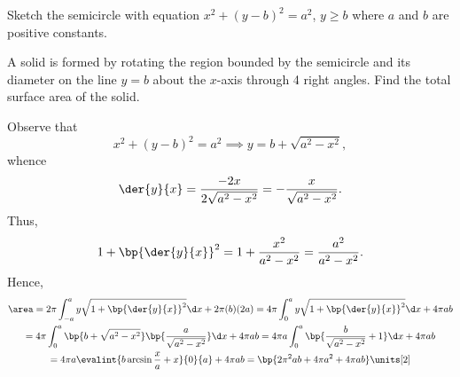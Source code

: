 \begin{problem}
    Sketch the semicircle with equation $x^2 + (y-b)^2 = a^2$, $y \geq b$ where $a$ and $b$ are positive constants.

    A solid is formed by rotating the region bounded by the semicircle and its diameter on the line $y = b$ about the $x$-axis through 4 right angles. Find the total surface area of the solid.
\end{problem}
\begin{solution}
    \begin{center}
    \end{center}

    Observe that \[x^2 + (y-b)^2 = a^2 \implies y = b + \sqrt{a^2- x^2},\] whence \[\der{y}{x} = \frac{-2x}{2\sqrt{a^2 - x^2}} = -\frac{x}{\sqrt{a^2 - x^2}}.\] Thus, \[1 + \bp{\der{y}{x}}^2 = 1 + \frac{x^2}{a^2 - x^2} = \frac{a^2}{a^2 - x^2}.\] Hence,
    \begin{gather*}
        \area = 2\pi \int_{-a}^{a} y \sqrt{1 + \bp{\der{y}{x}}^2} \d x + 2\pi(b)(2a) = 4\pi \int_0^{a} y \sqrt{1 + \bp{\der{y}{x}}^2} \d x + 4\pi ab\\
        = 4\pi \int_0^a \bp{b + \sqrt{a^2 - x^2}} \bp{\frac{a}{\sqrt{a^2 - x^2}}} \d x + 4\pi ab = 4\pi a \int_0^a \bp{\frac{b}{\sqrt{{a^2-x^2}}} + 1} \d x + 4\pi ab\\
        = 4\pi a \evalint{b\arcsin \frac{x}{a} + x}{0}{a} + 4\pi ab = \bp{2\pi^2 ab + 4\pi a^2 + 4\pi ab} \units[2]
    \end{gather*}
\end{solution}

